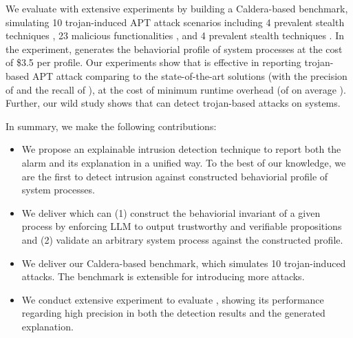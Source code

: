 We evaluate \tool with extensive experiments by building a Caldera-based benchmark,
simulating 10 trojan-induced APT attack scenarios including 
4 prevalent stealth techniques \cite{xx}, 
23 malicious functionalities \cite{xx}, and 
4 prevalent stealth techniques \cite{xx}.
In the experiment, \tool generates the behaviorial profile of  system processes
at the cost of \$3.5 per profile.
Our experiments show that 
\tool is effective in reporting trojan-based APT attack comparing to the state-of-the-art solutions (with the precision of  and the recall of ),
at the cost of minimum runtime overhead (of on average ).
Further, our wild study shows that \tool can detect  trojan-based attacks on  systems.

In summary, we make the following contributions:
\begin{itemize}[leftmargin=*]
  \item We propose an explainable intrusion detection technique \tool to report both the alarm and its explanation in a unified way. 
      To the best of our knowledge, we are the first to detect intrusion against constructed behaviorial profile of system processes.
  \item We deliver \tool which can 
    (1) construct the behaviorial invariant of a given process by enforcing LLM to output trustworthy and verifiable propositions and
    (2) validate an arbitrary system process against the constructed profile.
  \item We deliver our Caldera-based benchmark, which simulates 10 trojan-induced attacks. 
    The benchmark is extensible for introducing more attacks.
  \item We conduct extensive experiment to evaluate \tool, showing its performance regarding high precision in both the detection results and the generated explanation.
\end{itemize}
 